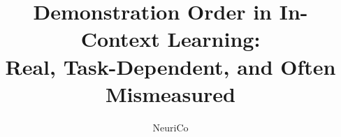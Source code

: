 \documentclass{article}
\title{Demonstration Order in In-Context Learning:\\ Real, Task-Dependent, and Often Mismeasured}
\author{NeuriCo}
\begin{document}
\maketitle

\begin{abstract}

\end{abstract}










\appendix

\end{document}
